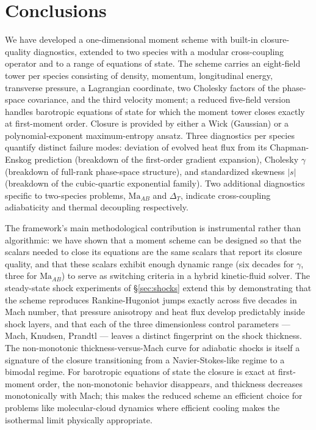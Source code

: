 \documentclass[11pt,letterpaper]{article}
\newcommand{\Ma}{\mathrm{Ma}}
\begin{document}
\section{Conclusions}
\label{sec:conclusions}

We have developed a one-dimensional moment scheme with built-in closure-quality diagnostics, extended to two species with a modular cross-coupling operator and to a range of equations of state. The scheme carries an eight-field tower per species consisting of density, momentum, longitudinal energy, transverse pressure, a Lagrangian coordinate, two Cholesky factors of the phase-space covariance, and the third velocity moment; a reduced five-field version handles barotropic equations of state for which the moment tower closes exactly at first-moment order. Closure is provided by either a Wick (Gaussian) or a polynomial-exponent maximum-entropy ansatz. Three diagnostics per species quantify distinct failure modes: deviation of evolved heat flux from its Chapman-Enskog prediction (breakdown of the first-order gradient expansion), Cholesky $\gamma$ (breakdown of full-rank phase-space structure), and standardized skewness $|s|$ (breakdown of the cubic-quartic exponential family). Two additional diagnostics specific to two-species problems, $\Ma_{AB}$ and $\Delta_T$, indicate cross-coupling adiabaticity and thermal decoupling respectively.

The framework's main methodological contribution is instrumental rather than algorithmic: we have shown that a moment scheme can be designed so that the scalars needed to close its equations are the same scalars that report its closure quality, and that these scalars exhibit enough dynamic range (six decades for $\gamma$, three for $\Ma_{AB}$) to serve as switching criteria in a hybrid kinetic-fluid solver. The steady-state shock experiments of \S\ref{sec:shocks} extend this by demonstrating that the scheme reproduces Rankine-Hugoniot jumps exactly across five decades in Mach number, that pressure anisotropy and heat flux develop predictably inside shock layers, and that each of the three dimensionless control parameters --- Mach, Knudsen, Prandtl --- leaves a distinct fingerprint on the shock thickness. The non-monotonic thickness-versus-Mach curve for adiabatic shocks is itself a signature of the closure transitioning from a Navier-Stokes-like regime to a bimodal regime. For barotropic equations of state the closure is exact at first-moment order, the non-monotonic behavior disappears, and thickness decreases monotonically with Mach; this makes the reduced scheme an efficient choice for problems like molecular-cloud dynamics where efficient cooling makes the isothermal limit physically appropriate.
\end{document}

